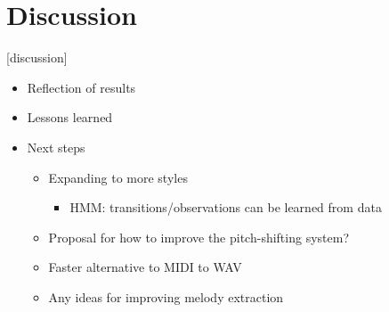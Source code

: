 \section{Discussion}

[discussion]

\begin{itemize}
    \item Reflection of results
    \item Lessons learned
    \item Next steps
    \begin{itemize}
        \item Expanding to more styles
        \begin{itemize}
            \item HMM: transitions/observations can be learned from data
        \end{itemize}
        \item Proposal for how to improve the pitch-shifting system?
        \item Faster alternative to MIDI to WAV
        \item Any ideas for improving melody extraction
    \end{itemize}
\end{itemize}

